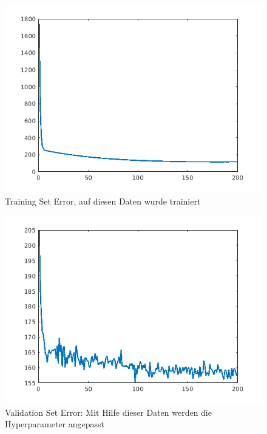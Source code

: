 \documentclass{hbrs-ecta-report}
\begin{document}
\begin{figure}[h]
	\centering
	\includegraphics[width=\linewidth]{img/trainingError}
	\caption{Training Set Error, auf diesen Daten wurde trainiert}
	\label{fig:trainingerror}
\end{figure}

\begin{figure}[h]
	\centering
	\includegraphics[width=\linewidth]{img/validationError}
	\caption{Validation Set Error: Mit Hilfe dieser Daten werden die Hyperparameter angepasst }
	\label{fig:validationerror}
\end{figure}

\newpage
\end{document}
